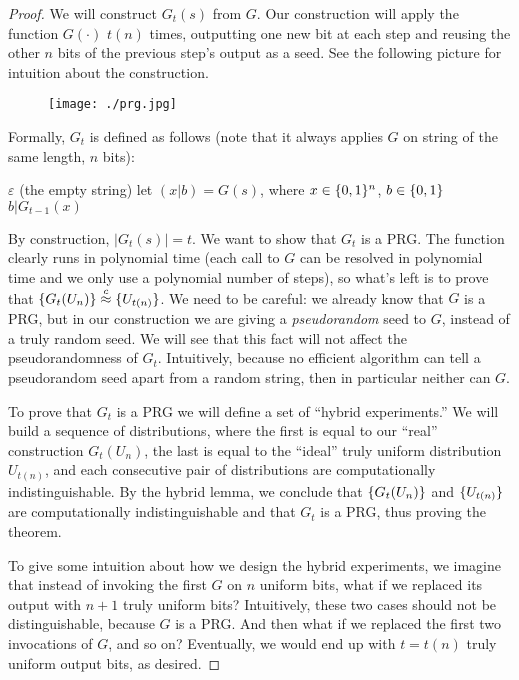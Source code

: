 \documentclass[11pt]{article}
\begin{document}
\begin{proof}
  We will construct $G_t(s)$ from $G$.  Our construction will apply
  the function $G(\cdot)$ $t(n)$ times, outputting one new bit at each
  step and reusing the other $n$ bits of the previous step's output as
  a seed.  See the following picture for intuition about the
  construction.

  \begin{figure}[h!]
    \centering
    \texttt{[image: ./prg.jpg]}
  \end{figure}

  Formally, $G_t$ is defined as follows (note that it always applies
  $G$ on string of the same length, $n$ bits):
  \begin{algorithm}[h]
    \caption{$G_t(s)$}
    \begin{algorithmic}
       \RETURN $\varepsilon$ (the empty string)
      \ELSE \STATE let $(x|b)=G(s)$, where $x \in \{0,1\}^{n}$, $b \in \{0,1\}$
      \RETURN $b|G_{t-1}(x)$
      \ENDIF
    \end{algorithmic}
  \end{algorithm}

  By construction, $|G_t(s)|=t$.  We want to show that $G_t$ is a PRG.
  The function clearly runs in polynomial time (each call to $G$ can
  be resolved in polynomial time and we only use a polynomial number
  of steps), so what's left is to prove that $\{G_t(U_n)\} \stackrel{c}{\approx}
  \{U_{t(n)}\}$.  We need to be careful: we already know that $G$ is
  a PRG, but in our construction we are giving a \emph{pseudorandom}
  seed to $G$, instead of a truly random seed.  We will see that this
  fact will not affect the pseudorandomness of $G_t$.  Intuitively,
  because no efficient algorithm can tell a pseudorandom seed apart
  from a random string, then in particular neither can $G$.

  To prove that $G_t$ is a PRG we will define a set of ``hybrid
  experiments.''  We will build a sequence of distributions, where the
  first is equal to our ``real'' construction $G_t(U_{n})$, the last
  is equal to the ``ideal'' truly uniform distribution $U_{t(n)}$, and
  each consecutive pair of distributions are computationally
  indistinguishable.  By the hybrid lemma, we conclude that
  $\{G_t(U_{n})\}$ and $\{U_{t(n)}\}$ are computationally
  indistinguishable and that $G_t$ is a PRG, thus proving the theorem.

  To give some intuition about how we design the hybrid experiments,
  we imagine that instead of invoking the first $G$ on $n$ uniform
  bits, what if we replaced its output with $n+1$ truly uniform bits?
  Intuitively, these two cases should not be distinguishable, because
  $G$ is a PRG.  And then what if we replaced the first two
  invocations of $G$, and so on?  Eventually, we would end up with $t
  = t(n)$ truly uniform output bits, as desired.


\end{proof}
\end{document}
